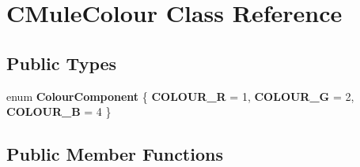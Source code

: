 \section{CMuleColour Class Reference}
\label{classCMuleColour}
\subsection*{Public Types}
\begin{DoxyCompactItemize}
\item 
enum {\bfseries ColourComponent} \{ {\bfseries COLOUR\_\-R} =  1, 
{\bfseries COLOUR\_\-G} =  2, 
{\bfseries COLOUR\_\-B} =  4
 \}
\end{DoxyCompactItemize}
\subsection*{Public Member Functions}
